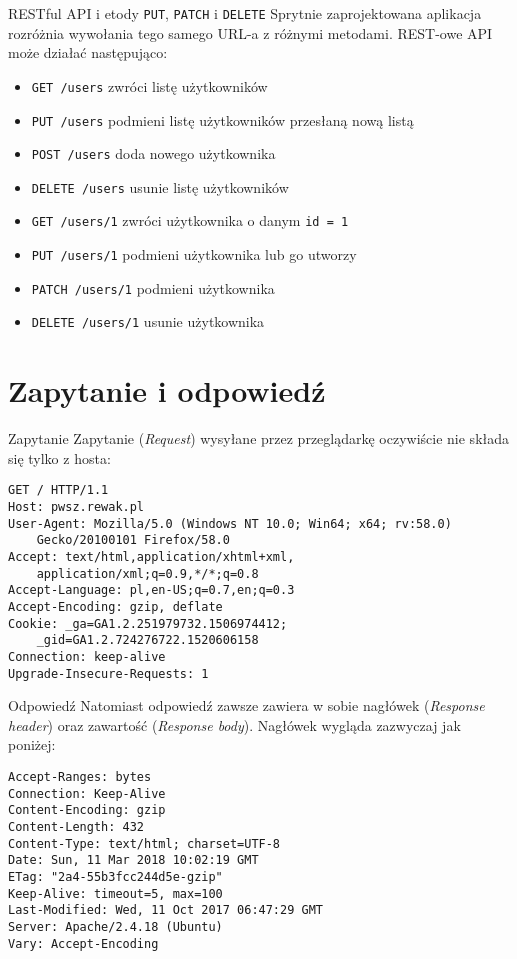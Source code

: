 \begin{frame}[fragile]{RESTful API i etody \texttt{PUT},  \texttt{PATCH} i \texttt{DELETE}}
	Sprytnie zaprojektowana aplikacja rozróżnia wywołania tego samego URL-a z różnymi metodami. REST-owe API może działać następująco:
	
	\begin{itemize}
		\item \texttt{GET /users} zwróci listę użytkowników
		\item \texttt{PUT /users} podmieni listę użytkowników przesłaną nową listą
		\item \texttt{POST /users} doda nowego użytkownika
		\item \texttt{DELETE /users} usunie listę użytkowników
	\end{itemize}
	
	\begin{itemize}
		\item \texttt{GET /users/1} zwróci użytkownika o danym \texttt{id = 1}
		\item \texttt{PUT /users/1} podmieni użytkownika lub go utworzy
		\item \texttt{PATCH /users/1} podmieni użytkownika
		\item \texttt{DELETE /users/1} usunie użytkownika
	\end{itemize}
	
\end{frame}

\section{Zapytanie i odpowiedź}

\begin{frame}[fragile]{Zapytanie}
	Zapytanie (\emph{Request}) wysyłane przez przeglądarkę oczywiście nie składa się tylko z hosta:

	\begin{lstlisting}
GET / HTTP/1.1
Host: pwsz.rewak.pl
User-Agent: Mozilla/5.0 (Windows NT 10.0; Win64; x64; rv:58.0)
	Gecko/20100101 Firefox/58.0
Accept: text/html,application/xhtml+xml,
	application/xml;q=0.9,*/*;q=0.8
Accept-Language: pl,en-US;q=0.7,en;q=0.3
Accept-Encoding: gzip, deflate
Cookie: _ga=GA1.2.251979732.1506974412; 
	_gid=GA1.2.724276722.1520606158
Connection: keep-alive
Upgrade-Insecure-Requests: 1
	\end{lstlisting}
\end{frame}

\begin{frame}[fragile]{Odpowiedź}
	Natomiast odpowiedź zawsze zawiera w sobie nagłówek (\emph{Response header}) oraz zawartość (\emph{Response body}). Nagłówek wygląda zazwyczaj jak poniżej:

	\begin{lstlisting}
Accept-Ranges: bytes
Connection: Keep-Alive
Content-Encoding: gzip
Content-Length: 432
Content-Type: text/html; charset=UTF-8
Date: Sun, 11 Mar 2018 10:02:19 GMT
ETag: "2a4-55b3fcc244d5e-gzip"
Keep-Alive: timeout=5, max=100
Last-Modified: Wed, 11 Oct 2017 06:47:29 GMT
Server: Apache/2.4.18 (Ubuntu)
Vary: Accept-Encoding
	\end{lstlisting}
\end{frame}

